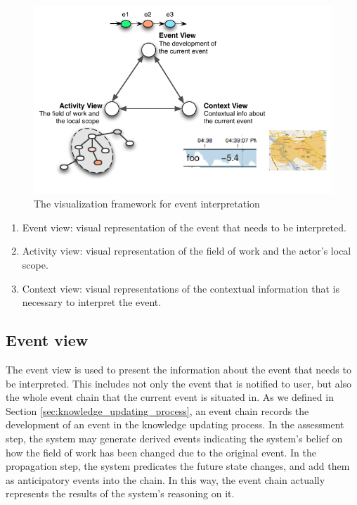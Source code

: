 \begin{figure}[htbp] %
	\centering
	\includegraphics{event_interpretation.pdf} 
	\caption{The visualization framework for event interpretation}
	\label{fig:event_interpretation}
\end{figure}

\begin{enumerate}
	\item Event view: visual representation of the event that needs to be interpreted.
	\item Activity view: visual representation of the field of work and the actor's local scope.
	\item Context view: visual representations of the contextual information that is necessary to interpret the event.
\end{enumerate}

\subsection{Event view} %
\label{sub:event_view}
The event view is used to present the information about the event that needs to be interpreted. This includes not only the event that is notified to user, but also the whole event chain that the current event is situated in. As we defined in Section \ref{sec:knowledge_updating_process}, an event chain records the development of an event in the knowledge updating process. In the assessment step, the system may generate derived events indicating the system's belief on how the field of work has been changed due to the original event. In the propagation step, the system predicates the future state changes, and add them as anticipatory events into the chain. In this way, the event chain actually represents the results of the system's reasoning on it. 

